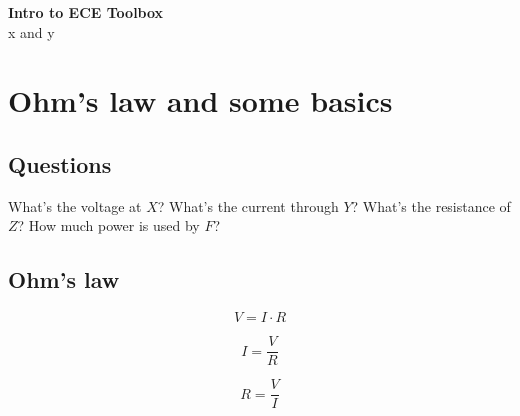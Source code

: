 \documentclass[10pt,landscape]{cheatsheet}
\begin{document}
\footnotesize
\begin{multicols}{3}

\begin{center}
     \Large{\textbf{Intro to ECE Toolbox}} \\
     x and y
\end{center}

\section{Ohm's law and some basics}
\subsection{Questions}
What's the voltage at $X$? What's the current through $Y$?
What's the resistance of $Z$? How much power is used by $F$?
\subsection{Ohm's law}
\[ V=I \cdot R \]

\[I=\frac{V}{R}\]

\[R=\frac{V}{I}\]
































\end{multicols}
\end{document}
